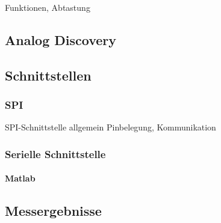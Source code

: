 Funktionen, Abtastung

\subsection {Analog Discovery} \label{analogdiscovery}

\subsection {Schnittstellen} \label {schnittstellen}

\subsubsection {SPI} \label {spi}

SPI-Schnittstelle allgemein
Pinbelegung, Kommunikation

\subsubsection {Serielle Schnittstelle} \label {serial}

\paragraph {Matlab} \label{matlab}

\subsection {Messergebnisse} \label {messergebnis}



